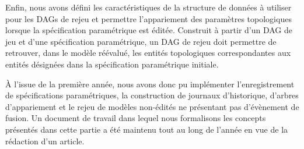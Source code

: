 Enfin, nous avons défini les caractéristiques de la structure de données à
utiliser pour les DAGs de rejeu et permettre l'appariement des paramètres
topologiques lorsque la spécification paramétrique est éditée. %
Construit à partir d'un DAG de jeu et d'une spécification paramétrique, un DAG
de rejeu doit permettre de retrouver, dans le modèle réévalué, les entités
topologiques correspondantes aux entités désignées dans la spécification
paramétrique initiale. %

À l'issue de la première année, nous avons donc pu implémenter l'enregistrement
de spécifications paramétriques, la construction de journaux d'historique,
d'arbres d'appariement et le rejeu de modèles non-édités ne présentant pas
d'évènement de fusion. %
Un document de travail dans lequel nous formalisons les concepts présentés dans
cette partie a été maintenu tout au long de l'année en vue de la rédaction d'un
article. %


